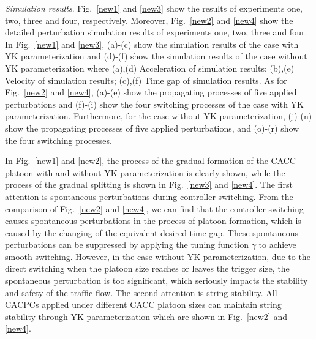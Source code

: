 \documentclass[trsc,nonblindrev]{informs3} %
\begin{document}



\textit{Simulation results}. Fig.~\ref{new1} and \ref{new3} show the results of experiments one, two, three and four, respectively. Moreover, Fig.~\ref{new2} and \ref{new4} show the detailed perturbation simulation results of experiments one, two, three and four. In Fig.~\ref{new1} and \ref{new3}, (a)-(c) show the simulation results of the case with YK parameterization and (d)-(f) show the simulation results of the case without YK parameterization where (a),(d) Acceleration of simulation results; (b),(e) Velocity of simulation results; (c),(f) Time gap of simulation results. As for Fig.~\ref{new2} and \ref{new4}, (a)-(e) show the propagating processes of five applied perturbations and (f)-(i) show the four switching processes of the case with YK parameterization. Furthermore, for the case without YK parameterization, (j)-(n) show the propagating processes of five applied perturbations, and (o)-(r) show the four switching processes.

In Fig.~\ref{new1} and \ref{new2}, the process of the gradual formation of the CACC platoon with and without YK parameterization is clearly shown, while the process of the gradual splitting is shown in Fig.~\ref{new3} and \ref{new4}. The first attention is spontaneous perturbations during controller switching. From the comparison of Fig.~\ref{new2} and \ref{new4}, we can find that the controller switching causes spontaneous perturbations in the process of platoon formation, which is caused by the changing of the equivalent desired time gap. These spontaneous perturbations can be suppressed by applying the tuning function $\gamma$ to achieve smooth switching. However, in the case without YK parameterization, due to the direct switching when the platoon size reaches or leaves the trigger size, the spontaneous perturbation is too significant, which seriously impacts the stability and safety of the traffic flow. The second attention is string stability. All CACPCs applied under different CACC platoon sizes can maintain string stability through YK parameterization which are shown in Fig.~\ref{new2} and \ref{new4}.
\end{document}
